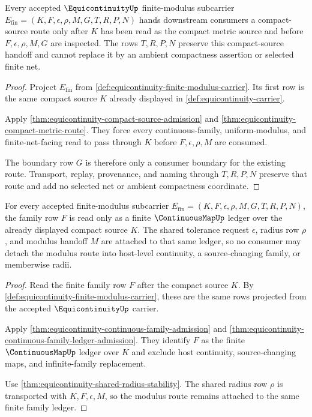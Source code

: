 \begin{theorem}
\label{thm:equicontinuity-compactmetric-handoff}
Every accepted $\EquicontinuityUp$ finite-modulus subcarrier $E_{\mathrm{fin}}=(K,F,\epsilon,\rho,M,G,T,R,P,N)$ hands downstream consumers a compact-source route only after $K$ has been read as the compact metric source and before $F,\epsilon,\rho,M,G$ are inspected. The rows $T,R,P,N$ preserve this compact-source handoff and cannot replace it by an ambient compactness assertion or selected finite net.
\end{theorem}
\begin{proof}
Project $E_{\mathrm{fin}}$ from \autoref{def:equicontinuity-finite-modulus-carrier}. Its first row is the same compact source $K$ already displayed in \autoref{def:equicontinuity-carrier}.

Apply \autoref{thm:equicontinuity-compact-source-admission} and \autoref{thm:equicontinuity-compact-metric-route}. They force every continuous-family, uniform-modulus, and finite-net-facing read to pass through $K$ before $F,\epsilon,\rho,M$ are consumed.

The boundary row $G$ is therefore only a consumer boundary for the existing route. Transport, replay, provenance, and naming through $T,R,P,N$ preserve that route and add no selected net or ambient compactness coordinate.
\end{proof}

\begin{theorem}
\label{thm:equicontinuity-continuousmap-modulus-route}
For every accepted finite-modulus subcarrier $E_{\mathrm{fin}}=(K,F,\epsilon,\rho,M,G,T,R,P,N)$, the family row $F$ is read only as a finite $\ContinuousMapUp$ ledger over the already displayed compact source $K$. The shared tolerance request $\epsilon$, radius row $\rho$, and modulus handoff $M$ are attached to that same ledger, so no consumer may detach the modulus route into host-level continuity, a source-changing family, or memberwise radii.
\end{theorem}
\begin{proof}
Read the finite family row $F$ after the compact source $K$. By \autoref{def:equicontinuity-finite-modulus-carrier}, these are the same rows projected from the accepted $\EquicontinuityUp$ carrier.

Apply \autoref{thm:equicontinuity-continuous-family-admission} and \autoref{thm:equicontinuity-continuous-family-ledger-admission}. They identify $F$ as the finite $\ContinuousMapUp$ ledger over $K$ and exclude host continuity, source-changing maps, and infinite-family replacement.

Use \autoref{thm:equicontinuity-shared-radius-stability}. The shared radius row $\rho$ is transported with $K,F,\epsilon,M$, so the modulus route remains attached to the same finite family ledger.
\end{proof}

